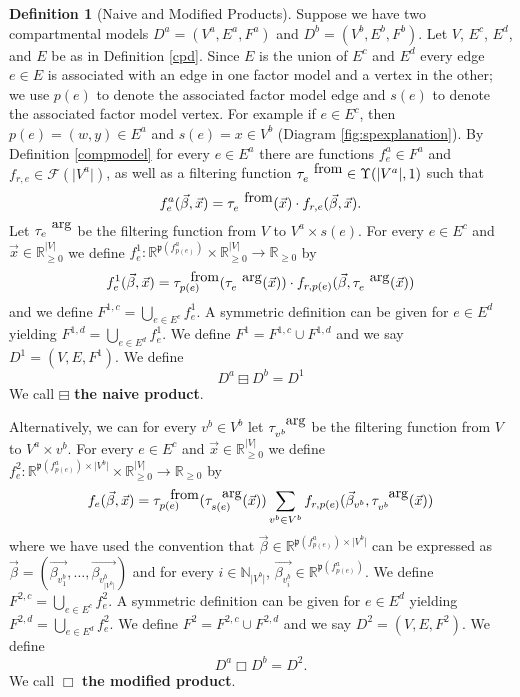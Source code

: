 \documentclass[pdflatex,sn-basic]{sn-jnl}%
\theoremstyle{definition}
\newtheorem{definition}{Definition}
\newcommand{\Nset}[1]{\mathbb{N}_{#1}}%
\newcommand{\R}{\mathbb{R}}%
\newcommand{\Rnn}{\mathbb{R}_{\ge 0}}%
\newcommand{\abs}[1]{\lvert #1 \rvert}%
\newcommand{\pardim}[1]{\mathfrak{p}(#1)}%
\newcommand{\betavec}{\vec{\beta}}
\newcommand{\xvec}{\vec{x}}
\newcommand{\fr}{\ensuremath{\mathcal F}}
\newcommand{\tauf}{\tau^{\mbox{\tiny from}}}
\newcommand{\taua}{\tau^{\mbox{\tiny arg}}}
\begin{document}
\begin{definition}[Naive and Modified Products]\label{products}
 Suppose we have two compartmental models $D^a = (V^a, E^a, F^a)$ and $D^b = (V^b, E^b, F^b)$. Let $V$, $E^c$, $E^d$, and $E$ be as in Definition \ref{cpd}. Since $E$ is the union of $E^c$ and $E^d$ every edge $e\in E$ is associated with an edge in one factor model and a vertex in the other; we use $p(e)$ to denote the associated factor model edge and $s(e)$ to denote the associated factor model vertex. For example if $e\in E^c$, then $p(e) = (w,y)\in E^a$ and $s(e) = x \in V^b$ (Diagram \ref{fig:spexplanation}). By Definition \ref{compmodel} for every $e\in E^a$ there are functions $f^a_{e}\in F^a$ and $f_{r,e}\in \fr(\abs{V^a})$, as well as a filtering function $\tauf_{e}\in\Upsilon(\abs{V^a}, 1)$ such that
 \begin{equation}
        f^a_{e}(\betavec, \xvec) = \tauf_e(\xvec)\cdot f_{r,e}(\betavec, \xvec).
 \end{equation}
 Let $\taua_e$ be the filtering function from $V$ to $V^a\times s(e)$. For every $e\in E^c$ and $\vec{x}\in\Rnn^{\abs{V}}$ we define $f^1_e:\R^{\pardim{f^a_{p(e)}}}\times\Rnn^{\abs{V}}\rightarrow\Rnn$ by
 \begin{equation}
        f^1_e(\betavec, \xvec) = \tauf_{p(e)}(\taua_e(\xvec))\cdot f_{r,p(e)}(\betavec, \taua_e(\xvec))
 \end{equation}
 and we define $F^{1,c} = \bigcup\limits_{e\in E^c}f^1_e$. A symmetric definition can be given for $e\in E^d$ yielding $F^{1,d} = \bigcup\limits_{e\in E^d}f^1_e$. We define $F^1 = F^{1,c}\cup F^{1,d}$ and we say $D^1 = (V, E, F^1)$. We define
 \begin{equation}
        D^a\boxminus D^b = D^1
 \end{equation} We call $\boxminus$ \textbf{the naive product}.

 Alternatively, we can for every $v^b\in V^b$ let $\taua_{v^b}$ be the filtering function from $V$ to $V^a\times v^b$. For every $e\in E^c$ and $\vec{x}\in\Rnn^{\abs{V}}$ we define $f^2_e:\R^{\pardim{f^a_{p(e)}}\times \abs{V^b}}\times\Rnn^{\abs{V}}\rightarrow\Rnn$ by
 \begin{equation}\label{modified_eq}
    f_e(\vec{\beta}, \vec{x}) = \tauf_{p(e)}(\taua_{s(e)}(\xvec))\sum\limits_{v^b\in V^b} f_{r,p(e)}(\betavec_{v^b},\taua_{v^b}(\xvec))
 \end{equation}
 where we have used the convention that $\vec{\beta}\in\R^{\pardim{f^a_{p(e)}}\times \abs{V^b}}$ can be expressed as $\vec{\beta} = (\vec{\beta_{v^b_1}}, \ldots, \vec{\beta_{v^b_{\abs{V^b}}}})$ and for every $i\in\Nset{\abs{V^b}}$, $\vec{\beta_{v^b_i}}\in \R^{\pardim{f^a_{p(e)}}}$. We define $F^{2,c} = \bigcup\limits_{e\in E^c}f^2_e$. A symmetric definition can be given for $e\in E^d$ yielding $F^{2,d} = \bigcup\limits_{e\in E^d}f^2_e$. We define $F^2 = F^{2,c}\cup F^{2,d}$ and we say $D^2=(V, E, F^2)$. We define
 \begin{equation}
    D^a\Box D^b = D^2.
 \end{equation} We call $\Box$ \textbf{the modified product}.
\end{definition}
\end{document}
